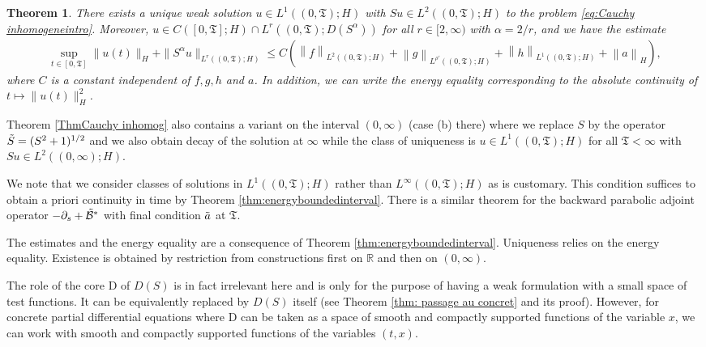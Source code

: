 \documentclass[11pt, letterpaper]{amsart}
\newtheorem{thm}{Theorem}[section]
\theoremstyle{definition}
\theoremstyle{remark}
\numberwithin{equation}{section}
\begin{document}
\begin{thm}\label{Thm:Cauchyinhomogintro}  There exists a unique weak solution $u\in L^1((0,\mathfrak{T}); H)$ with $Su\in L^2((0,\mathfrak{T}); H)$ to the problem \eqref{eq:Cauchy inhomogeneintro}. Moreover,  
      $u \in C([0,\mathfrak{T}];H) \cap L^r((0,\mathfrak{T});D(S^\alpha))$ for all $r\in [2,\infty)$ with $\alpha=2/r$,  and we have the estimate
        \begin{align*}
            \sup_{t\in [0,\mathfrak{T}]} \| u(t) \|_{H}+\|  S^\alpha u  \|_{L^r((0,\mathfrak{T});H)}
            \leq C  ( \left \| f \right \|_{L^2((0,\mathfrak{T});H)} + \left \| g \right \|_{L^{\rho'}((0,\mathfrak{T});H)}+ \left \| h \right \|_{L^{1}((0,\mathfrak{T});H)}+ \left \| a \right \|_H  ),
        \end{align*} 
        where $C$ is a constant independent of $f,g,h$ and $a$. In addition, we can write the energy equality corresponding to the absolute continuity of $t\mapsto \|u(t)\|^2_{H}$.
\end{thm}

Theorem \ref{ThmCauchy inhomog} also contains a variant  on the interval $(0,\infty)$ (case (b) there) where we replace $S$ by the operator $\Tilde{S}=(S^2+1)^{1/2}$ and we also obtain decay of the solution at $\infty$ while the class of uniqueness is $u\in L^1((0,\mathfrak{T}); H)$ for all $\mathfrak{T}<\infty$ with $Su\in L^2((0,\infty); H)$.

We note that we consider classes of solutions in $L^1((0,\mathfrak{T}); H)$ rather than $L^\infty((0,\mathfrak{T}); H)$  as is customary. This condition suffices to obtain a priori continuity in time by Theorem \ref{thm:energyboundedinterval}. There is a similar theorem for the backward parabolic adjoint operator $ -\partial_s  +\Tilde{\mathcal{B}}^*$ with final condition $\Tilde{a}$ at $\mathfrak{T}$. 

The estimates and the energy equality are a consequence of Theorem \ref{thm:energyboundedinterval}. Uniqueness relies on the energy equality. Existence is obtained by restriction from constructions first on $\mathbb{R}$ and then on $(0,\infty)$.

The role of the core $\mathrm{D}$ of $D(S)$ is in fact irrelevant here and is only for the purpose of having a weak formulation with a small space of test functions. It can be equivalently replaced by $D(S)$ itself (see Theorem \ref{thm: passage au concret} and its proof). However, for concrete partial differential equations where $\mathrm{D}$ can be taken as  a space of smooth and compactly supported functions of the variable $x$,  we can work with smooth and compactly supported functions of the variables $(t,x)$.
\end{document}
